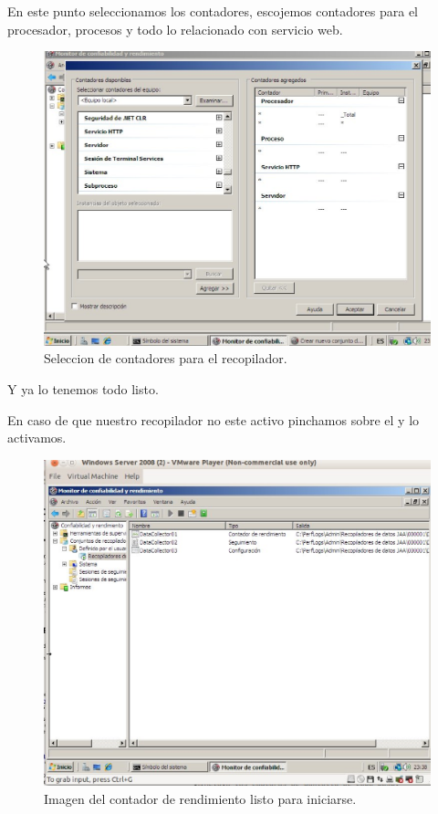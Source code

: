 En este punto  seleccionamos los contadores, escojemos contadores para el procesador, procesos y todo lo relacionado con servicio web.

\begin{figure}[H]
\begin{center}
\includegraphics[scale=0.4]{imagenes/ejercicio5-4.eps}
\caption{Seleccion de contadores para el recopilador.}
\end{center}
\end{figure}

Y ya lo tenemos todo listo.

En caso de que nuestro recopilador no este activo pinchamos sobre el y lo activamos. 

\begin{figure}[H]
\begin{center}
\includegraphics[scale=0.4]{imagenes/ejercicio5-5.eps}
\caption{Imagen del contador de rendimiento listo para iniciarse.}
\end{center}
\end{figure}



